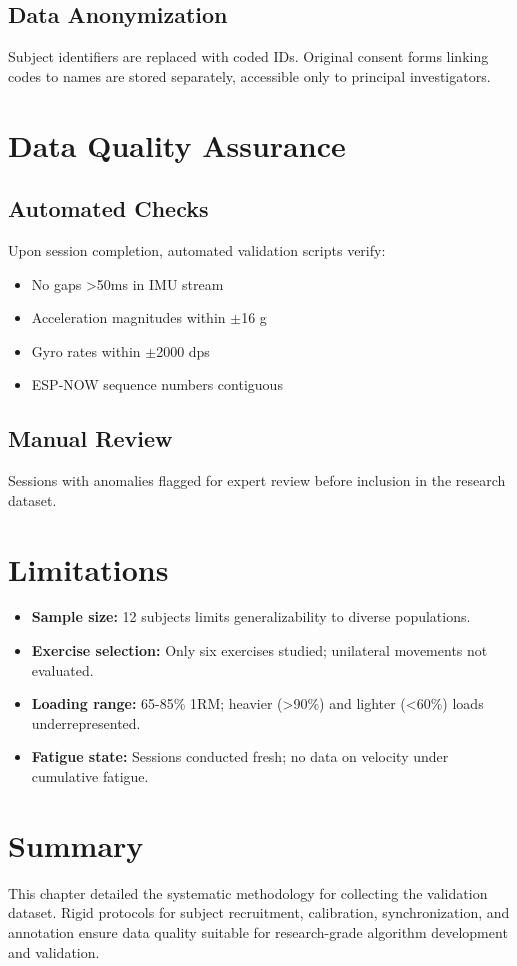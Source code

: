 \subsection{Data Anonymization}

Subject identifiers are replaced with coded IDs. Original consent forms linking codes to names are stored separately, accessible only to principal investigators.

\section{Data Quality Assurance}

\subsection{Automated Checks}

Upon session completion, automated validation scripts verify:
\begin{itemize}
    \item No gaps >50ms in IMU stream
    \item Acceleration magnitudes within $\pm$16 g
    \item Gyro rates within $\pm$2000 dps
    \item ESP-NOW sequence numbers contiguous
\end{itemize}

\subsection{Manual Review}

Sessions with anomalies flagged for expert review before inclusion in the research dataset.

\section{Limitations}

\begin{itemize}
    \item \textbf{Sample size:} 12 subjects limits generalizability to diverse populations.
    \item \textbf{Exercise selection:} Only six exercises studied; unilateral movements not evaluated.
    \item \textbf{Loading range:} 65-85\% 1RM; heavier (>90\%) and lighter (<60\%) loads underrepresented.
    \item \textbf{Fatigue state:} Sessions conducted fresh; no data on velocity under cumulative fatigue.
\end{itemize}

\section{Summary}

This chapter detailed the systematic methodology for collecting the validation dataset. Rigid protocols for subject recruitment, calibration, synchronization, and annotation ensure data quality suitable for research-grade algorithm development and validation.

\newpage